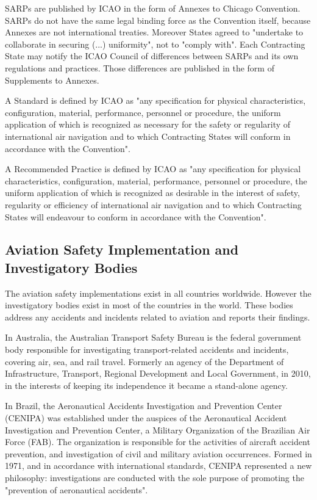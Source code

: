 \documentclass[a4paper, 10pt]{article}
\begin{document}
SARPs are published by ICAO in the form of Annexes to Chicago Convention. SARPs do not have the same legal binding force as the Convention itself, because Annexes are not international treaties. Moreover States agreed to "undertake to collaborate in securing (...) uniformity", not to "comply with". Each Contracting State may notify the ICAO Council of differences between SARPs and its own regulations and practices. Those differences are published in the form of Supplements to Annexes.\par

A Standard is defined by ICAO as "any specification for physical characteristics, configuration, material, performance, personnel or procedure, the uniform application of which is recognized as necessary for the safety or regularity of international air navigation and to which Contracting States will conform in accordance with the Convention".\par

A Recommended Practice is defined by ICAO as "any specification for physical characteristics, configuration, material, performance, personnel or procedure, the uniform application of which is recognized as desirable in the interest of safety, regularity or efficiency of international air navigation and to which Contracting States will endeavour to conform in accordance with the Convention".\par

\subsection{Aviation Safety Implementation and Investigatory Bodies}
The aviation safety implementations exist in all countries worldwide. However the investigatory bodies exist in most of the countries in the world. These bodies address any accidents and incidents related to aviation and reports their findings.\par

In Australia, the Australian Transport Safety Bureau is the federal government body responsible for investigating transport-related accidents and incidents, covering air, sea, and rail travel. Formerly an agency of the Department of Infrastructure, Transport, Regional Development and Local Government, in 2010, in the interests of keeping its independence it became a stand-alone agency.\par
In Brazil, the Aeronautical Accidents Investigation and Prevention Center (CENIPA) was established under the auspices of the Aeronautical Accident Investigation and Prevention Center, a Military Organization of the Brazilian Air Force (FAB). The organization is responsible for the activities of aircraft accident prevention, and investigation of civil and military aviation occurrences. Formed in 1971, and in accordance with international standards, CENIPA represented a new philosophy: investigations are conducted with the sole purpose of promoting the "prevention of aeronautical accidents".\par
\end{document}
